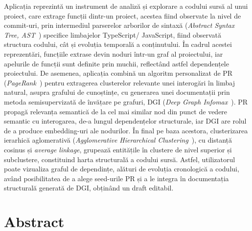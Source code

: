 \documentclass[12pt]{article}
\numberwithin{equation}{section}
\numberwithin{figure}{section}
\numberwithin{table}{section}
\theoremstyle{definition}
\theoremstyle{plain}
\begin{document}
Aplicația reprezintă un instrument de analiză și explorare a codului sursă al unui proiect, care extrage funcții dintr-un proiect, acestea fiind observate la nivel de commit-uri, prin intermediul parserelor arborilor de sintaxă (\textit{Abstract Syntax Tree, AST}~\cite{aho2006compilers}) specifice limbajelor TypeScript/ JavaScript, fiind observată structura codului, cât și evoluția temporală a conținutului. În cadrul acestei reprezentări, funcțiile extrase devin noduri într-un graf al proiectului, iar apelurile de funcții sunt definite prin muchii, reflectând astfel dependențele proiectului. De asemenea, aplicația combină un algoritm personalizat de PR (\textit{PageRank}~\cite{page1999pagerank}) pentru extragerea clusterelor relevante unei interogări în limbaj natural, asupra grafului de cunoștințe, cu generarea unei documentații prin metoda semisupervizată de învățare pe grafuri, DGI (\textit{Deep Graph Infomax}~\cite{velickovic2019dgi}). PR propagă relevanța semantică de la cel mai similar nod din punct de vedere semantic cu interogarea, de-a lungul dependențelor structurale, iar DGI are rolul de a produce embedding-uri ale nodurilor. În final pe baza acestora, clusterizarea ierarhică aglomerativă (\textit{Agglomerative Hierarchical Clustering}~\cite{ward1963hierarchical}), cu distanță cosinus și \textit{average linkage}, grupează entitățile în clustere de nivel superior și subclustere, constituind harta structurală a codului sursă. Astfel, utilizatorul poate vizualiza graful de dependințe, alături de evoluția cronologică a codului, având posibilitatea de a alege seed-urile PR și a le integra în documentația structurală generată de DGI, obținând un draft editabil.

\section*{Abstract}
\end{document}
